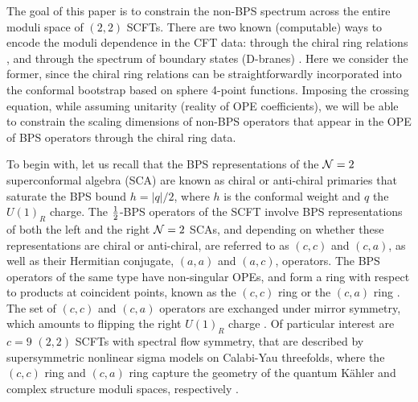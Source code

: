 \documentclass[12pt]{article}
\begin{document}
The goal of this paper is to constrain the non-BPS spectrum across the entire moduli space of $(2,2)$ SCFTs. There are two known (computable) ways to encode the moduli dependence in the CFT data: through the chiral ring relations \cite{Cecotti:1990kz, Cecotti:1991me}, and through the spectrum of boundary states (D-branes) \cite{Ooguri:1996ck}. Here we consider the former, since the chiral ring relations can be straightforwardly incorporated into the conformal bootstrap based on sphere 4-point functions. Imposing the crossing equation, while assuming unitarity (reality of OPE coefficients), we will be able to constrain the scaling dimensions of non-BPS operators that appear in the OPE of BPS operators through the chiral ring data.

To begin with, let us recall that the BPS representations of the ${\cal N}=2$ superconformal algebra (SCA) are known as chiral or anti-chiral primaries
that saturate the BPS bound $h=|q|/2$, where $h$ is the conformal weight and $q$ the $U(1)_R$ charge. The ${1\over 2}$-BPS operators of the SCFT involve BPS representations of both the left and the right ${\cal N}=2$ SCAs, and depending on whether these representations are chiral or anti-chiral, are referred to as $(c,c)$ and $(c,a)$, as well as their Hermitian conjugate, $(a,a)$ and $(a,c)$, operators. The BPS operators of the same type have non-singular OPEs, and form a ring with respect to products at coincident points, known as the $(c,c)$ ring or the $(c,a)$ ring \cite{Lerche:1989uy}. The set of $(c,c)$ and $(c,a)$ operators are exchanged under mirror symmetry, which amounts to flipping the right $U(1)_R$ charge \cite{Candelas:1990rm, Witten:1991zz}. Of particular interest are $c=9$ $(2,2)$ SCFTs with spectral flow symmetry, that are described by supersymmetric nonlinear sigma models on Calabi-Yau threefolds, where the $(c,c)$ ring and $(c,a)$ ring capture the geometry of the quantum K\"ahler and complex structure moduli spaces, respectively \cite{Lerche:1989uy}.

\end{document}
